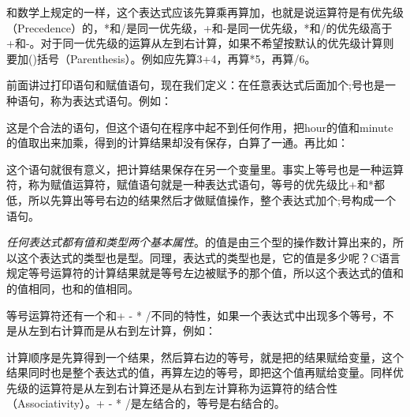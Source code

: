 和数学上规定的一样，这个表达式应该先算乘再算加，也就是说运算符是有优先级（Precedence）的，*和/是同一优先级，+和-是同一优先级，*和/的优先级高于+和-。对于同一优先级的运算从左到右计算，如果不希望按默认的优先级计算则要加()括号（Parenthesis）。例如应先算3+\BookSplit{}4，再算*5，再算/6。



前面讲过打印语句和赋值语句，现在我们定义：在任意表达式后面加个;号也是一种语句，称为表达式语句。例如：




这是个合法的语句，但这个语句在程序中起不到任何作用，把hour的值和minute的值取出来加乘，得到的计算结果却没有保存，白算了一通。再比如：




这个语句就很有意义，把计算结果保存在另一个变量里。事实上等号也是一种运算符，称为赋值运算符，赋值语句就是一种表达式语句，等号的优先级比+和*都低，所以先算出等号右边的结果然后才做赋值操作，整个表达式加个;号构成一个语句。



\emph{任何表达式都有值和类型两个基本属性}。的值是由三个型的操作数计算出来的，所以这个表达式的类型也是型。同理，表达式的类型也是，它的值是多少呢？C语言规定等号运算符的计算结果就是等号左边被赋予的那个值，所以这个表达式的值和的值相同，也和的值相同。



等号运算符还有一个和+ - * /不同的特性，如果一个表达式中出现多个等号，不是从左到右计算而是从右到左计算，例如：




计算顺序是先算得到一个结果，然后算右边的等号，就是把的结果赋给变量，这个结果同时也是整个表达式的值，再算左边的等号，即把这个值再赋给变量。同样优先级的运算符是从左到右计算还是从右到左计算称为运算符的结合性（Associativity）。+ - * /是左结合的，等号是右结合的。



